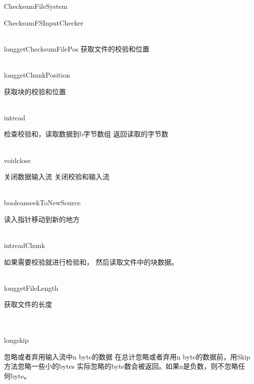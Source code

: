 \begin{XeClass}{ChecksumFileSystem}
\begin{XeInnerClass}{ChecksumFSInputChecker}
\begin{XeMethod}{\XePrivate\\ }{long}{getChecksumFilePos}
 获取文件的校验和位置

    \end{XeMethod}

    \begin{XeMethod}{\XeProtected\\ }{long}{getChunkPosition}
         
 获取块的校验和位置

    \end{XeMethod}

    \begin{XeMethod}{\XePublic\\ }{int}{read}
         
 检查校验和，读取数据到b字节数组
 返回读取的字节数

    \end{XeMethod}

    \begin{XeMethod}{\XePublic\\ }{void}{close}
         
 关闭数据输入流
 关闭校验和输入流

    \end{XeMethod}

    \begin{XeMethod}{\XePublic\\ }{boolean}{seekToNewSource}
         
 读入指针移动到新的地方

    \end{XeMethod}

    \begin{XeMethod}{\XeProtected\\ }{int}{readChunk}
         
 如果需要校验就进行检验和，
 然后读取文件中的块数据。

    \end{XeMethod}

    \begin{XeMethod}{\XePrivate\\ }{long}{getFileLength}
         
 获取文件的长度

    \end{XeMethod}

    \begin{XeMethod}{\XePublic\\ \XeSync\\ }{long}{skip}
         
 忽略或者弃用输入流中n byte的数据
 在总计忽略或者弃用n byte的数据前，用Skip方法忽略一些小的bytes
 实际忽略的byte数会被返回。如果n是负数，则不忽略任何byte。


\end{XeMethod}
\end{XeInnerClass}
\end{XeClass}
